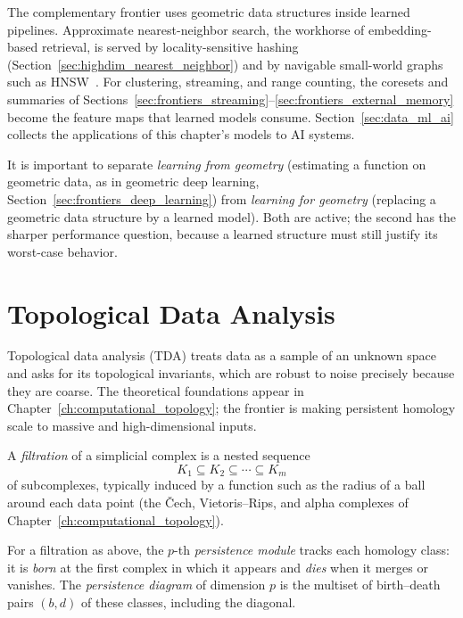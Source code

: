 The complementary frontier uses geometric data structures inside learned
pipelines. Approximate nearest-neighbor search, the workhorse of
embedding-based retrieval, is served by locality-sensitive hashing
(Section~\ref{sec:highdim_nearest_neighbor}) and by navigable small-world
graphs such as HNSW~\cite{indyk1998,malkov2018}. For clustering, streaming, and
range counting, the coresets and summaries of
Sections~\ref{sec:frontiers_streaming}--\ref{sec:frontiers_external_memory}
become the feature maps that learned models consume. Section~\ref{sec:data_ml_ai}
collects the applications of this chapter's models to AI systems.

\begin{remark}\label{rem:frontiers_learning}
It is important to separate \emph{learning from geometry} (estimating a
function on geometric data, as in geometric deep learning,
Section~\ref{sec:frontiers_deep_learning}) from \emph{learning for geometry}
(replacing a geometric data structure by a learned model). Both are active; the
second has the sharper performance question, because a learned structure must
still justify its worst-case behavior.
\end{remark}

\section{Topological Data Analysis}
\label{sec:frontiers_tda}

Topological data
analysis (TDA) treats data as a sample of an unknown space and asks for its
topological invariants, which are robust to noise precisely because they are
coarse. The theoretical foundations appear in Chapter~\ref{ch:computational_topology};
the frontier is making persistent homology scale to massive and
high-dimensional inputs.

\begin{definition}[Filtration]\label{def:frontiers_filtration}
A \emph{filtration} of a simplicial complex is a nested sequence
\[
K_1 \subseteq K_2 \subseteq \cdots \subseteq K_m
\]
of subcomplexes, typically induced by a function such as the radius of a ball
around each data point (the \v{C}ech, Vietoris--Rips, and alpha complexes of
Chapter~\ref{ch:computational_topology}).
\end{definition}

\begin{definition}\label{def:frontiers_persistence}
For a filtration as above, the $p$-th \emph{persistence module} tracks each
homology class: it is \emph{born} at the first complex in which it appears and
\emph{dies} when it merges or vanishes. The \emph{persistence diagram} of
dimension $p$ is the multiset of birth--death pairs $(b, d)$ of these classes,
including the diagonal.
\end{definition}

